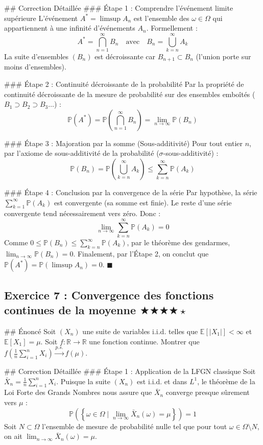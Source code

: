 \documentclass[11pt,a4paper]{article}
\begin{document}
\#\# Correction Détaillée
\#\#\# Étape 1 : Comprendre l'événement limite supérieure
L'événement $A^* = \limsup A_n$ est l'ensemble des $\omega \in \Omega$ qui appartiennent à une infinité d'événements $A_n$. Formellement :
$$ A^* = \bigcap_{n=1}^\infty B_n \quad \text{avec} \quad B_n = \bigcup_{k=n}^\infty A_k $$
La suite d'ensembles $(B_n)$ est décroissante car $B_{n+1} \subset B_n$ (l'union porte sur moins d'ensembles).

\#\#\# Étape 2 : Continuité décroissante de la probabilité
Par la propriété de continuité décroissante de la mesure de probabilité sur des ensembles emboîtés ($B_1 \supset B_2 \supset B_3 \dots$) :
$$ \mathbb{P}(A^*) = \mathbb{P}\left( \bigcap_{n=1}^\infty B_n \right) = \lim_{n \to \infty} \mathbb{P}(B_n) $$

\#\#\# Étape 3 : Majoration par la somme (Sous-additivité)
Pour tout entier $n$, par l'axiome de sous-additivité de la probabilité ($\sigma$-sous-additivité) :
$$ \mathbb{P}(B_n) = \mathbb{P}\left( \bigcup_{k=n}^\infty A_k \right) \le \sum_{k=n}^\infty \mathbb{P}(A_k) $$

\#\#\# Étape 4 : Conclusion par la convergence de la série
Par hypothèse, la série $\sum_{k=1}^\infty \mathbb{P}(A_k)$ est convergente (sa somme est finie).
Le reste d'une série convergente tend nécessairement vers zéro. Donc :
$$ \lim_{n \to \infty} \sum_{k=n}^\infty \mathbb{P}(A_k) = 0 $$
Comme $0 \le \mathbb{P}(B_n) \le \sum_{k=n}^\infty \mathbb{P}(A_k)$, par le théorème des gendarmes, $\lim_{n \to \infty} \mathbb{P}(B_n) = 0$.
Finalement, par l'Étape 2, on conclut que $\mathbb{P}(A^*) = \mathbb{P}(\limsup A_n) = 0$. $\blacksquare$


\subsection*{Exercice 7 : Convergence des fonctions continues de la moyenne \quad $\bigstar\bigstar\bigstar\bigstar\star$}

\#\# Énoncé
Soit $(X_n)$ une suite de variables i.i.d. telles que $\mathbb{E}[|X_1|] < \infty$ et $\mathbb{E}[X_1] = \mu$.
Soit $f : \mathbb{R} \to \mathbb{R}$ une fonction continue.
Montrer que $f\left(\frac{1}{n} \sum_{i=1}^n X_i\right) \xrightarrow{p.s.} f(\mu)$.

\#\# Correction Détaillée
\#\#\# Étape 1 : Application de la LFGN classique
Soit $\bar{X}_n = \frac{1}{n} \sum_{i=1}^n X_i$.
Puisque la suite $(X_n)$ est i.i.d. et dans $L^1$, le théorème de la Loi Forte des Grands Nombres nous assure que $\bar{X}_n$ converge presque sûrement vers $\mu$ :
$$ \mathbb{P}\left(\left\{\omega \in \Omega \mid \lim_{n \to \infty} \bar{X}_n(\omega) = \mu \right\}\right) = 1 $$
Soit $N \subset \Omega$ l'ensemble de mesure de probabilité nulle tel que pour tout $\omega \in \Omega \setminus N$, on ait $\lim_{n \to \infty} \bar{X}_n(\omega) = \mu$.
\end{document}
